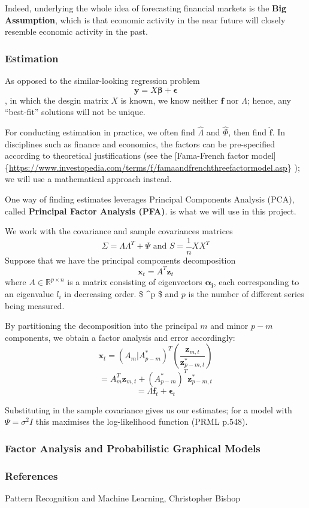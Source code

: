 \documentclass[]{article}
\begin{document}
Indeed, underlying the whole idea of forecasting financial markets is
the \textbf{Big Assumption}, which is that economic activity in the near
future will closely resemble economic activity in the past.

\hypertarget{estimation}{%
\subsubsection{Estimation}\label{estimation}}

As opposed to the similar-looking regression problem
\[\boldsymbol{y} = X \boldsymbol{\beta} + \boldsymbol{\epsilon} \], in
which the desgin matrix \(X\) is known, we know neither
\(\boldsymbol{f}\) nor \(\Lambda\); hence, any ``best-fit'' solutions
will not be unique.

For conducting estimation in practice, we often find \(\hat{\Lambda}\)
and \(\hat{\Phi}\), then find \(\boldsymbol{\hat{f}}\). In disciplines
such as finance and economics, the factors can be pre-specified
according to theoretical justifications (see the {[}Fama-French factor
model{]}\{\url{https://www.investopedia.com/terms/f/famaandfrenchthreefactormodel.asp}\}
); we will use a mathematical approach instead.

One way of finding estimates leverages Principal Components Analysis
(PCA), called \textbf{Principal Factor Analysis (PFA)}. is what we will
use in this project.

We work with the covariance and sample covariances matrices
\[ \Sigma = \Lambda \Lambda^T + \Psi \text{ and } 
S = \frac{1}{n}XX^T\] Suppose that we have the principal components
decomposition \[ \mathbf{x}_t = A^T \mathbf{z}_t  \] where
\(A \in \mathbb{R}^{p \times n}\) is a matrix consisting of eigenvectors
\(\boldsymbol{\alpha_i}\), each corresponding to an eigenvalue \(l_i\)
in decreasing order. \$ \in {}\^{}p \$ and \(p\) is
the number of different series being measured.

By partitioning the decomposition into the principal \(m\) and minor
\(p-m\) components, we obtain a factor analysis and error accordingly:
\[\mathbf{x}_t = (A_m|A^*_{p-m} )^T  \left( \frac{\mathbf{z}_{m,t}} {\mathbf{z}^*_{p-m,t}} \right) \]
\[ = A_m^T \mathbf{z}_{m,t} + (A^*_{p-m})^T \mathbf{z}^*_{p-m,t} \]
\[= \Lambda \mathbf{f}_t + \boldsymbol{\epsilon}_t \]

Substituting in the sample covariance gives us our estimates; for a
model with \(\Psi = \sigma^2 I\) this maximises the log-likelihood
function (PRML p.548).

\hypertarget{factor-analysis-and-probabilistic-graphical-models}{%
\subsubsection{Factor Analysis and Probabilistic Graphical
Models}\label{factor-analysis-and-probabilistic-graphical-models}}

\hypertarget{references}{%
\subsubsection{References}\label{references}}

Pattern Recognition and Machine Learning, Christopher Bishop
\end{document}
